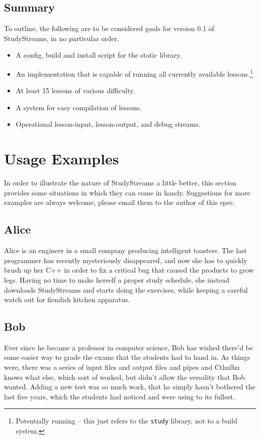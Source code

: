 \documentclass[12pt,a4paper]{report}
\begin{document}
		\section{Summary}
			To outline, the following are to be considered goals for version
			0.1 of StudyStreams, in no particular order.
			\begin{itemize}
				\item A config, build and install script for the static library.
				\item An implementation that is capable of running all currently
					available lessons.\footnote{Potentially running -- this just
					refers to the \texttt{study} library, not to a build system.}
				\item At least 15 lessons of various difficulty.
				\item A system for easy compilation of lessons.
				\item Operational lesson-input, lesson-output, and debug streams.
			\end{itemize}

	\chapter{Usage Examples}
		In order to illustrate the nature of StudyStreams a little better,
		this section provides some situations in which they can come in handy.
		Suggestions for more examples are always welcome, please email them to
		the author of this spec.

		\section{Alice}
			Alice is an engineer in a small company producing intelligent
			toasters.  The last programmer has recently mysteriously
			disappeared, and now she has to quickly brush up her C++ in
			order to fix a critical bug that caused the products to grow
			legs.  Having no time to make herself a proper study schedule,
			she instead downloads StudyStreams and starts doing the exercises,
			while keeping a careful watch out for fiendish kitchen apparatus.

		\section{Bob}
			Ever since he became a professor in computer science, Bob has wished
			there'd be some easier way to grade the exams that the students had
			to hand in.  As things were, there was a series of input files and
			output files and pipes and Cthulhu knows what else, which sort of
			worked, but didn't allow the versality that Bob wanted.  Adding a new
			test was so much work, that he simply hasn't bothered the last five
			years, which the students had noticed and were using to its fullest.
\end{document}
